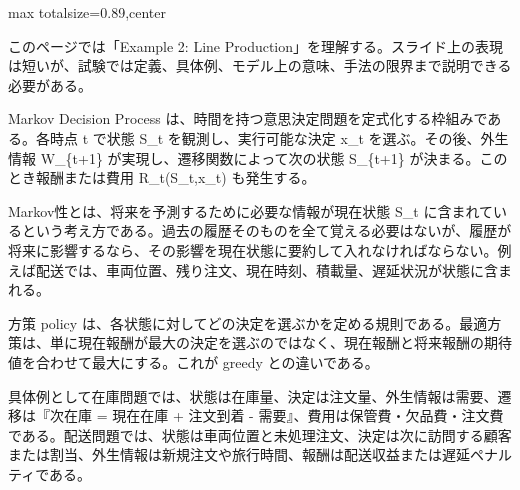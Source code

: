\begin{minipage}[t]{0.58\textwidth}
\begin{adjustbox}{max totalsize={\textwidth}{0.89\textheight},center}
\begin{minipage}{\textwidth}\scriptsize
{}このページでは「Example 2: Line Production」を理解する。スライド上の表現は短いが、試験では定義、具体例、モデル上の意味、手法の限界まで説明できる必要がある。\par
Markov Decision Process は、時間を持つ意思決定問題を定式化する枠組みである。各時点 t で状態 S\_t を観測し、実行可能な決定 x\_t を選ぶ。その後、外生情報 W\_\{t+1\} が実現し、遷移関数によって次の状態 S\_\{t+1\} が決まる。このとき報酬または費用 R\_t(S\_t,x\_t) も発生する。\par
Markov性とは、将来を予測するために必要な情報が現在状態 S\_t に含まれているという考え方である。過去の履歴そのものを全て覚える必要はないが、履歴が将来に影響するなら、その影響を現在状態に要約して入れなければならない。例えば配送では、車両位置、残り注文、現在時刻、積載量、遅延状況が状態に含まれる。\par
方策 policy は、各状態に対してどの決定を選ぶかを定める規則である。最適方策は、単に現在報酬が最大の決定を選ぶのではなく、現在報酬と将来報酬の期待値を合わせて最大にする。これが greedy との違いである。\par
具体例として在庫問題では、状態は在庫量、決定は注文量、外生情報は需要、遷移は『次在庫 = 現在在庫 + 注文到着 - 需要』、費用は保管費・欠品費・注文費である。配送問題では、状態は車両位置と未処理注文、決定は次に訪問する顧客または割当、外生情報は新規注文や旅行時間、報酬は配送収益または遅延ペナルティである。\par

\end{minipage}
\end{adjustbox}
\end{minipage}
